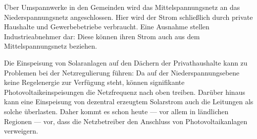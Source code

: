 \documentclass[12pt,BCOR=8.5mm]{scrartcl}
\begin{document}
\begin{enumerate}
    Über Umspannwerke in den Gemeinden wird das Mittelspannungsnetz an
    das Niederspannungsnetz angeschlossen. Hier wird der Strom
    schließlich durch private Haushalte und Gewerbebetriebe verbraucht.
    Eine Ausnahme stellen Industrieabnehmer dar: Diese können ihren
    Strom auch aus dem Mittelspannungsnetz beziehen.

    Die Einspeisung von Solaranlagen auf den Dächern der Privathaushalte
    kann zu Problemen bei der Netzregulierung führen: Da auf der
    Niederspannungsebene keine Regelenergie zur Verfügung steht, können
    signifikante Photovoltaikeinspeisungen die Netzfrequenz nach oben
    treiben. Darüber hinaus kann eine Einspeisung von dezentral
    erzeugtem Solarstrom auch die Leitungen als solche überlasten.
    Daher kommt es schon heute --- vor allem in ländlichen Regionen ---
    vor, dass die Netzbetreiber den Anschluss von Photovoltaikanlagen
    verweigern.
   

\end{enumerate}
\end{document}
